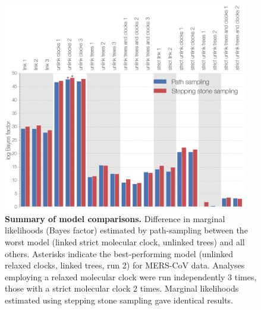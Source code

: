 \documentclass[11pt,oneside,letterpaper]{article}
\begin{document}
\begin{figure}[h!]
	\centering
	\includegraphics[width=0.95\textwidth]{figures/MERS_marginal_likelihoods.png}
	\caption{\textbf{Summary of model comparisons.}
Difference in marginal likelihoods (Bayes factor) estimated by path-sampling between the worst model (linked strict molecular clock, unlinked trees) and all others.
Asterisks indicate the best-performing model (unlinked relaxed clocks, linked trees, run 2) for MERS-CoV data.
Analyses employing a relaxed molecular clock were run independently 3 times, those with a strict molecular clock 2 times.
Marginal likelihoods estimated using stepping stone sampling gave identical results.}
	\label{marginal}
\end{figure}
\end{document}
